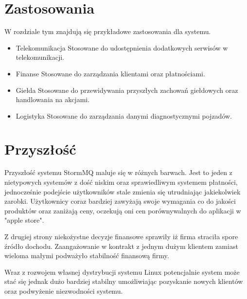 \documentclass[paper=a4, fontsize=11pt]{scrartcl} %
\numberwithin{equation}{section} %
\numberwithin{figure}{section} %
\numberwithin{table}{section} %
\begin{document}
\section{Zastosowania}

W rozdziale tym znajdują się przykładowe zastosowania dla systemu.

\begin{itemize}
    \item{Telekomunikacja} Stosowane do udostępnienia dodatkowych serwisów w telekomunikacji.
    \item{Finanse} Stosowane do zarządzania klientami oraz płatnościami.
    \item{Giełda} Stosowane do przewidywania przyszłych zachowań giełdowych oraz handlowania na akcjami.
    \item{Logistyka} Stosowane do zarządzania danymi diagnostycznymi pojzadów.
\end{itemize}

\section{Przyszłość}

Przyszłość systemu StormMQ maluje się w różnych barwach.
Jest to jeden z nietypowych systemów z dość niskim oraz sprawiedliwym systemem płatności,
jednocześnie podejście użytkowników stale zmienia się utrudniając jakiekolwiek zarobki.
Użytkownicy coraz bardziej zawyżają swoje wymagania co do jakości produktów oraz zaniżają
ceny, oczekują oni cen porównywalnych do aplikacji w "apple store".

Z drugiej strony niekożystne decyzje finansowe sprawiły iż firma straciła spore źródło dochodu.
Zaangażowanie w kontrakt z jednym dużym klientem zamiast wieloma małymi podważyło stabilność
finansową firmy.

Wraz z rozwojem własnej dystrybucji systemu Linux potencjalnie system może stać się jednak dużo bardziej stabilny
umożliwiając pozyskanie nowych klientów oraz podwyżenie niezwodności systemu.
\end{document}
